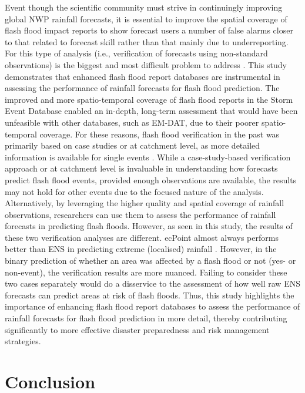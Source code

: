 Event  though the scientific community must strive in continuingly improving global NWP rainfall forecasts, it is essential to improve the spatial coverage of flash flood impact reports to show forecast users a number of false alarms closer to that related to forecast skill rather than that mainly due to underreporting. For this type of analysis (i.e., verification of forecasts using non-standard observations) is the biggest and most difficult problem to address \citep{Marsigli_2021}. This study demonstrates that enhanced flash flood report databases are instrumental in assessing the performance of rainfall forecasts for flash flood prediction. The improved and more spatio-temporal coverage of flash flood reports in the Storm Event Database enabled an in-depth, long-term assessment that would have been unfeasible with other databases, such as EM-DAT, due to their poorer spatio-temporal coverage. For these reasons, flash flood verification in the past was primarily based on case studies or at catchment level, as more detailed information is available for single events \citep{Gaume_2009, Gaume_2016}. While a case-study-based verification approach or at catchment level is invaluable in understanding how forecasts predict flash flood events, provided enough observations are available, the results may not hold for other events due to the focused nature of the analysis. Alternatively, by leveraging the higher quality and spatial coverage of rainfall observations, researchers can use them to assess the performance of rainfall forecasts in predicting flash floods. However, as seen in this study, the results of these two verification analyses are different. ecPoint almost always performs better than ENS in predicting extreme (localised) rainfall \citep{Gascón_2024, Hemri_2022, Hewson_2021}. However, in the binary prediction of whether an area was affected by a flash flood or not (yes- or non-event), the verification results are more nuanced. Failing to consider these two cases separately would do a disservice to the assessment of how well raw ENS forecasts can predict areas at risk of flash floods. Thus, this study highlights the importance of enhancing flash flood report databases to assess the performance of rainfall forecasts for flash flood prediction in more detail, thereby contributing significantly to more effective disaster preparedness and risk management strategies.


\section{Conclusion}
\label{flash_flood_focused_verification_rainfall_based_ff_conclusion}

